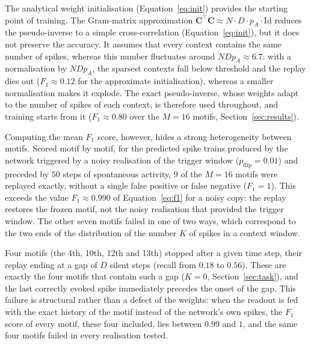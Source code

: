 \documentclass{scrartcl}
\begin{document}
The analytical weight initialisation (Equation~\ref{eq:init}) provides the starting point of training. The Gram-matrix approximation $\mathbf{C}^\top\mathbf{C} \approx N \cdot D \cdot p_A \cdot \mathrm{Id}$ reduces the pseudo-inverse to a simple cross-correlation (Equation~\ref{eq:init}), but it does not preserve the accuracy. It assumes that every context contains the same number of spikes, whereas this number fluctuates around $N D p_A \approx 6.7$: with a normalisation by $N D p_A$, the sparsest contexts fall below threshold and the replay dies out ($F_1 \approx 0.12$ for the approximate initialisation), whereas a smaller normalisation makes it explode. The exact pseudo-inverse, whose weights adapt to the number of spikes of each context, is therefore used throughout, and training starts from it ($F_1 \approx 0.80$ over the $M=16$ motifs, Section~\ref{sec:results}). %

Computing the mean $F_1$ score, however, hides a strong heterogeneity between motifs. Scored motif by motif, for the predicted spike trains produced by the network triggered by a noisy realisation of the trigger window ($p_\mathrm{flip} = 0.01$) and preceded by $50$ steps of spontaneous activity, $9$ of the $M = 16$ motifs were replayed exactly, without a single false positive or false negative ($F_1 = 1$). This exceeds the value $F_1 \approx 0.990$ of Equation~\ref{eq:f1} for a noisy copy: the replay restores the frozen motif, not the noisy realisation that provided the trigger window. The other seven motifs failed in one of two ways, which correspond to the two ends of the distribution of the number $K$ of spikes in a context window.

Four motifs (the 4th, 10th, 12th and 13th) stopped after a given time step, their replay ending at a gap of $D$ silent steps (recall from $0.18$ to $0.56$). These are exactly the four motifs that contain such a gap ($K = 0$, Section~\ref{sec:task}), and the last correctly evoked spike immediately precedes the onset of the gap. This failure is structural rather than a defect of the weights: when the readout is fed with the exact history of the motif instead of the network's own spikes, the $F_1$ score of every motif, these four included, lies between $0.99$ and $1$, and the same four motifs failed in every realisation tested.
\end{document}

